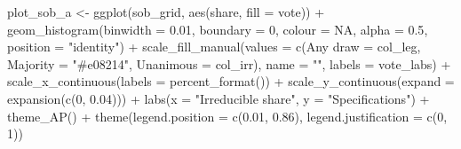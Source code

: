 \documentclass[
  11pt,
]{article}
\newenvironment{Shaded}{\begin{snugshade}}{\end{snugshade}}
\newcommand{\AttributeTok}[1]{\textcolor[rgb]{0.77,0.63,0.00}{#1}}
\newcommand{\ConstantTok}[1]{\textcolor[rgb]{0.00,0.00,0.00}{#1}}
\newcommand{\DecValTok}[1]{\textcolor[rgb]{0.00,0.00,0.81}{#1}}
\newcommand{\FloatTok}[1]{\textcolor[rgb]{0.00,0.00,0.81}{#1}}
\newcommand{\FunctionTok}[1]{\textcolor[rgb]{0.00,0.00,0.00}{#1}}
\newcommand{\NormalTok}[1]{#1}
\newcommand{\OtherTok}[1]{\textcolor[rgb]{0.56,0.35,0.01}{#1}}
\newcommand{\SpecialCharTok}[1]{\textcolor[rgb]{0.00,0.00,0.00}{#1}}
\newcommand{\StringTok}[1]{\textcolor[rgb]{0.31,0.60,0.02}{#1}}
\begin{document}
\begin{Shaded}
\begin{Highlighting}[]
\NormalTok{plot\_sob\_a }\OtherTok{\textless{}{-}} \FunctionTok{ggplot}\NormalTok{(sob\_grid, }\FunctionTok{aes}\NormalTok{(share, }\AttributeTok{fill =}\NormalTok{ vote)) }\SpecialCharTok{+}
  \FunctionTok{geom\_histogram}\NormalTok{(}\AttributeTok{binwidth =} \FloatTok{0.01}\NormalTok{, }\AttributeTok{boundary =} \DecValTok{0}\NormalTok{, }\AttributeTok{colour =} \ConstantTok{NA}\NormalTok{, }\AttributeTok{alpha =} \FloatTok{0.5}\NormalTok{,}
                 \AttributeTok{position =} \StringTok{"identity"}\NormalTok{) }\SpecialCharTok{+}
  \FunctionTok{scale\_fill\_manual}\NormalTok{(}\AttributeTok{values =} \FunctionTok{c}\NormalTok{(}\StringTok{\textasciigrave{}}\AttributeTok{Any draw}\StringTok{\textasciigrave{}} \OtherTok{=}\NormalTok{ col\_leg, }\AttributeTok{Majority =} \StringTok{"\#e08214"}\NormalTok{,}
                               \AttributeTok{Unanimous =}\NormalTok{ col\_irr), }\AttributeTok{name =} \StringTok{""}\NormalTok{,}
                    \AttributeTok{labels =}\NormalTok{ vote\_labs) }\SpecialCharTok{+}
  \FunctionTok{scale\_x\_continuous}\NormalTok{(}\AttributeTok{labels =} \FunctionTok{percent\_format}\NormalTok{()) }\SpecialCharTok{+}
  \FunctionTok{scale\_y\_continuous}\NormalTok{(}\AttributeTok{expand =} \FunctionTok{expansion}\NormalTok{(}\FunctionTok{c}\NormalTok{(}\DecValTok{0}\NormalTok{, }\FloatTok{0.04}\NormalTok{))) }\SpecialCharTok{+}
  \FunctionTok{labs}\NormalTok{(}\AttributeTok{x =} \StringTok{"Irreducible share"}\NormalTok{, }\AttributeTok{y =} \StringTok{"Specifications"}\NormalTok{) }\SpecialCharTok{+}
  \FunctionTok{theme\_AP}\NormalTok{() }\SpecialCharTok{+}
  \FunctionTok{theme}\NormalTok{(}\AttributeTok{legend.position =} \FunctionTok{c}\NormalTok{(}\FloatTok{0.01}\NormalTok{, }\FloatTok{0.86}\NormalTok{), }\AttributeTok{legend.justification =} \FunctionTok{c}\NormalTok{(}\DecValTok{0}\NormalTok{, }\DecValTok{1}\NormalTok{))}


\end{Highlighting}
\end{Shaded}
\end{document}
